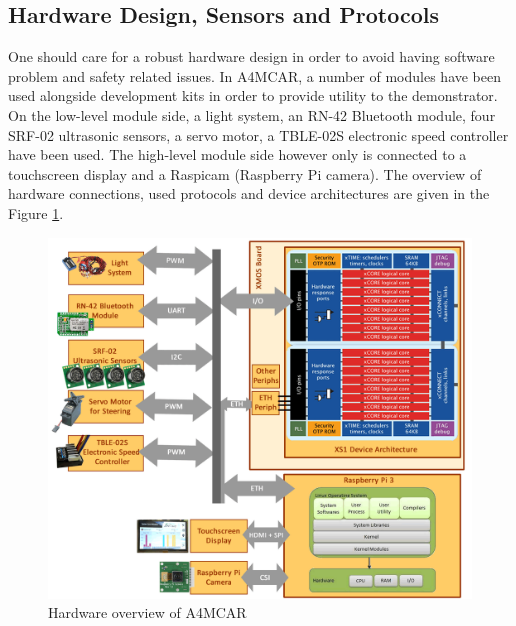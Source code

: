 \subsection{Hardware Design, Sensors and Protocols}
One should care for a robust hardware design in order to avoid having software problem and safety related issues. In A4MCAR, a number of modules have been used alongside development kits in order to provide utility to the demonstrator. On the low-level module side, a light system, an RN-42 Bluetooth module, four SRF-02 ultrasonic sensors, a servo motor, a TBLE-02S electronic speed controller have been used. The high-level module side however only is connected to a touchscreen display and a Raspicam (Raspberry Pi camera). The overview of hardware connections, used protocols and device architectures are given in the Figure \ref{fig:hwoverview}.
\begin{figure}[!ht]
	\includegraphics[scale=0.37]{content/images/hwoverview.png}
	\caption{Hardware overview of A4MCAR}
	\label{fig:hwoverview}
\end{figure}

